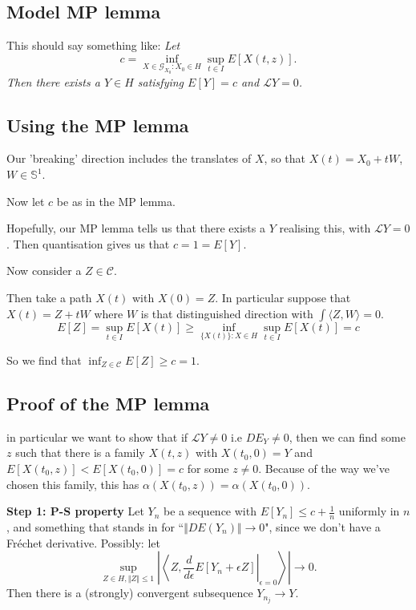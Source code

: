 \documentclass[12pt, a4paper]{amsart}
\theoremstyle{remark}
\newcommand{\So}{\mathbb{S}^1}
\begin{document}
\subsection*{Model MP lemma}   This should say something like:   \emph{Let $$c =\inf_{ X\in \mathcal{G}_{X_0}:{X_0\in H} } \sup_{t\in I} E[X(t,z)].$$ 
Then there exists a $Y\in H$ satisfying $E[Y]=c$ and $\mathcal{L}Y=0$.}



\subsection*{Using the MP lemma}

Our 'breaking' direction includes the translates of $X$, so that $X(t)=X_0 + tW$, $W \in \So$.  

Now let $c$ be as in the MP lemma.


Hopefully, our MP lemma tells us that there exists a $Y$ realising this, with $\mathcal{L}Y=0$.  Then quantisation gives us that $c=1=E[Y]$.  

Now consider a $Z\in\mathcal{C}$.       

Then take a path $X(t)$ with $X(0)=Z$.     In particular suppose that $X(t)=Z+tW$ where $W$ is that distinguished direction with $\int\langle Z,W\rangle =0$.  
$$E[Z]= \sup_{t\in I} E[X(t)] \ge \inf_{\lbrace X(t) \rbrace :  X\in H}  \sup_{t\in I} E[X(t)] =c $$

So we find that 
$\inf_{Z\in\mathcal{C}}E[Z]\ge c=1$.  


\subsection*{Proof of  the MP  lemma}  in particular we want to show that if $\mathcal{L}Y\not=0$ i.e $DE_Y \not=0$, then we can find some $z$ such that there is a family $X(t,z)$ with $X(t_0,0)=Y$  and    $E[X(t_0,z)]<E[X(t_0,0)]=c$ for some $z\not=0$.   Because of the way we've chosen this family, this has $\alpha(X(t_0,z))=\alpha(X(t_0,0))$.  



\textbf{Step 1:  P-S property}  Let $Y_n$ be a sequence with $E[Y_n]\le c+\frac1n$ uniformly in $n$, and something that stands in for ``$\Vert DE(Y_n) \Vert \to 0$", since we don't have a Fr\'echet derivative.   Possibly:   let 
$$ \sup_{Z\in H, \Vert Z \Vert \le 1} \left. \left| \left\langle Z, \dfrac{d}{d\epsilon} E[Y_n+\epsilon Z]\right|_{\epsilon=0} \right\rangle \right|\rightarrow 0.$$
Then there is a (strongly) convergent subsequence $Y_{n_j}\rightarrow Y$.  
\end{document}
